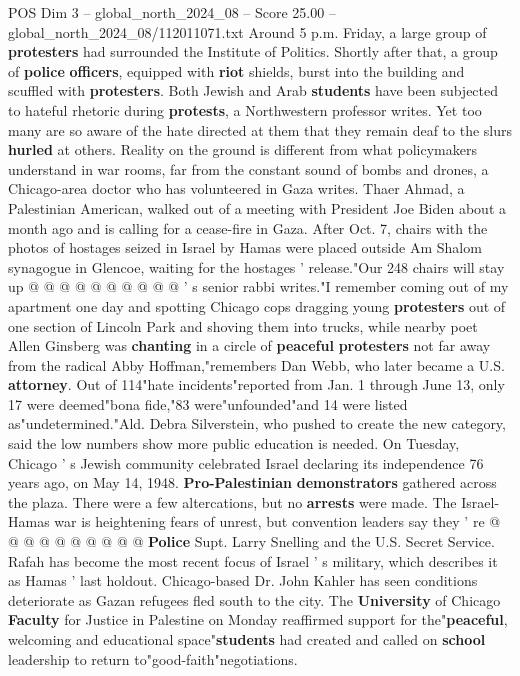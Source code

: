 \begin{textsample}{POS Dim 3 – global\_north\_2024\_08 – Score 25.00 – global\_north\_2024\_08/112011071.txt}
Around 5 p.m.
Friday, a large group of \textbf{protesters} had surrounded the Institute of Politics.
Shortly after that, a group of \textbf{police} \textbf{officers}, equipped with \textbf{riot} shields, burst into the building and scuffled with \textbf{protesters}.
Both Jewish and Arab \textbf{students} have been subjected to hateful rhetoric during \textbf{protests}, a Northwestern professor writes.
Yet too many are so aware of the hate directed at them that they remain deaf to the slurs \textbf{hurled} at others.
Reality on the ground is different from what policymakers understand in war rooms, far from the constant sound of bombs and drones, a Chicago-area doctor who has volunteered in Gaza writes.
Thaer Ahmad, a Palestinian American, walked out of a meeting with President Joe Biden about a month ago and is calling for a cease-fire in Gaza.
After Oct. 7, chairs with the photos of hostages seized in Israel by Hamas were placed outside Am Shalom synagogue in Glencoe, waiting for the hostages ' release."Our 248 chairs will stay up @ @ @ @ @ @ @ @ @ @ ' s senior rabbi writes."I remember coming out of my apartment one day and spotting Chicago cops dragging young \textbf{protesters} out of one section of Lincoln Park and shoving them into trucks, while nearby poet Allen Ginsberg was \textbf{chanting} in a circle of \textbf{peaceful} \textbf{protesters} not far away from the radical Abby Hoffman,"remembers Dan Webb, who later became a U.S. \textbf{attorney}.
Out of 114"hate incidents"reported from Jan. 1 through June 13, only 17 were deemed"bona fide,"83 were"unfounded"and 14 were listed as"undetermined."Ald.
Debra Silverstein, who pushed to create the new category, said the low numbers show more public education is needed.
On Tuesday, Chicago ' s Jewish community celebrated Israel declaring its independence 76 years ago, on May 14, 1948. \textbf{Pro-Palestinian} \textbf{demonstrators} gathered across the plaza.
There were a few altercations, but no \textbf{arrests} were made.
The Israel-Hamas war is heightening fears of unrest, but convention leaders say they ' re @ @ @ @ @ @ @ @ @ @ \textbf{Police} Supt.
Larry Snelling and the U.S.
Secret Service.
Rafah has become the most recent focus of Israel ' s military, which describes it as Hamas ' last holdout.
Chicago-based Dr.
John Kahler has seen conditions deteriorate as Gazan refugees fled south to the city.
The \textbf{University} of Chicago \textbf{Faculty} for Justice in Palestine on Monday reaffirmed support for the"\textbf{peaceful}, welcoming and educational space"\textbf{students} had created and called on \textbf{school} leadership to return to"good-faith"negotiations.

\end{textsample}
